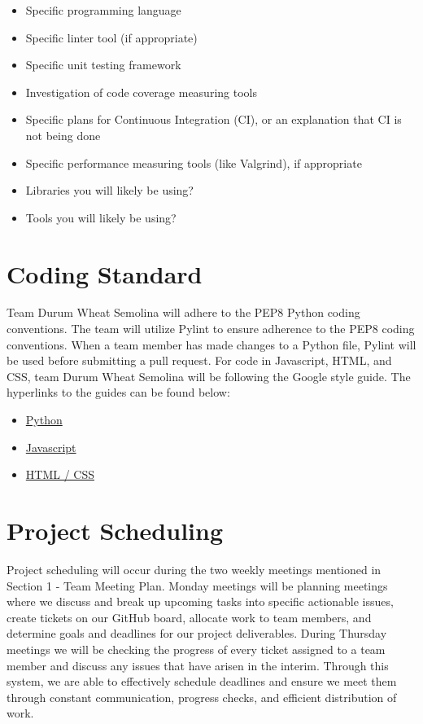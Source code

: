 \documentclass{article}
\begin{document}
\begin{itemize}
\item Specific programming language
\item Specific linter tool (if appropriate)
\item Specific unit testing framework
\item Investigation of code coverage measuring tools
\item Specific plans for Continuous Integration (CI), or an explanation that CI
  is not being done
\item Specific performance measuring tools (like Valgrind), if
  appropriate
\item Libraries you will likely be using?
\item Tools you will likely be using?
\end{itemize}

\section{Coding Standard}
Team Durum Wheat Semolina will adhere to the PEP8 Python coding conventions. The team will utilize Pylint to ensure adherence to the PEP8 coding conventions. When a team member has made changes to a Python file, Pylint will be used before submitting a pull request. For code in Javascript, HTML, and CSS, team Durum Wheat Semolina will be following the Google style guide. The hyperlinks to the guides can be found below:
\begin{itemize}
	\item \href{https://peps.python.org/pep-0008/}{Python}
	\item \href{https://google.github.io/styleguide/jsguide.html}{Javascript}
	\item \href{https://google.github.io/styleguide/htmlcssguide.html}{HTML / CSS}
\end{itemize}

\section{Project Scheduling}

Project scheduling will occur during the two weekly meetings mentioned in Section 1 - Team Meeting Plan. Monday meetings will be planning meetings where we discuss and break up upcoming tasks into specific actionable issues, create tickets on our GitHub board, allocate work to team members, and determine goals and deadlines for our project deliverables. During Thursday meetings we will be checking the progress of every ticket assigned to a team member and discuss any issues that have arisen in the interim. Through this system, we are able to effectively schedule deadlines and ensure we meet them through constant communication, progress checks, and efficient distribution of work.
\end{document}
